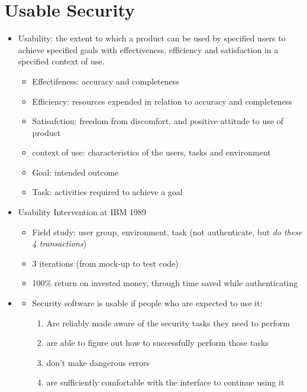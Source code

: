 \documentclass[a4paper,12pt]{scrartcl}
\begin{document}
\section{Usable Security}
\begin{itemize}
	\item
		Usability: the extent to which a product can be used by specified users to achieve specified goals with effectiveness, efficiency and satisfaction in a specified context of use.
		\begin{itemize}
			\item
				Effectifeness: accuracy and completeness
			\item
				Efficiency: resources expended in relation to accuracy and completeness
			\item
				Satisafction: freedom from discomfort, and positive attitude to use of product
			\item
				context of use: characteristics of the users, tasks and environment
			\item
				Goal: intended outcome
			\item
				Task: activities required to achieve a goal
		\end{itemize}
	\item
		Usability Intervention at IBM 1989
		\begin{itemize}
			\item
				Field study: user group, environment, task (not authenticate, but \textit{do these 4 transactions})
			\item
				3 iterations (from mock-up to test code)
			\item
				100\% return on invested money, through time  saved while authenticating
		\end{itemize}
	\item
		\begin{itemize}
			\item
				Security software is usable if people who are expected to use it:
				\begin{enumerate}
					\item
						Are reliably made aware of the security tasks they need to perform
					\item
						are able to figure out how to successfully perform those tasks
					\item
						don't make dangerous errors
					\item
						are sufficiently comfortable with the interface to continue using it
				\end{enumerate}

\end{itemize}
\end{itemize}
\end{document}
